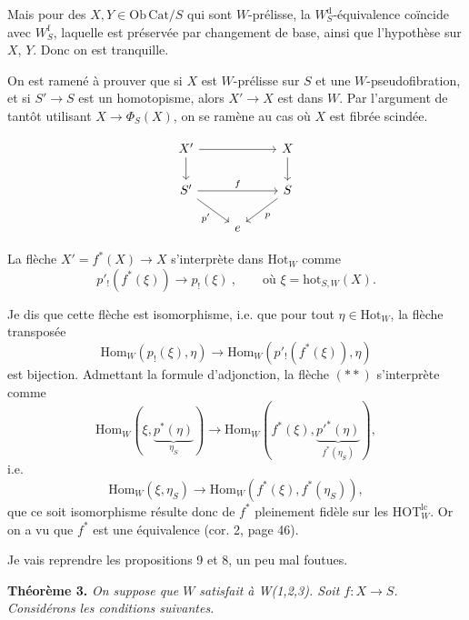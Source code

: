 \documentclass[11pt]{article}
\newcommand{\printedpage}[1]{\marginpar{\footnotesize p.~#1}}
\newcommand{\msp}[1]{\marginpar{\footnotesize [#1]}}
\newcommand{\HOTlc}{\mathrm{HOT}^{\mathrm{lc}}_W}
\newcommand{\Hot}{\mathrm{Hot}}
\newcommand{\Hom}{\mathrm{Hom}}
\newcommand{\hot}{\mathrm{hot}}
\newcommand{\Wd}{W^{\mathrm{d}}_S}
\newcommand{\Wf}{W^{\mathrm{f}}_S}
\begin{document}
Mais pour des $X, Y \in \mathrm{Ob}\,\mathrm{Cat}/S$ qui sont $W$-prélisse, la $\Wd$-équivalence coïncide avec $\Wf$, laquelle est préservée par changement de base, ainsi que l'hypothèse sur $X$, $Y$. Donc on est tranquille.

On est ramené à prouver que si $X$ est $W$-prélisse sur $S$ et une $W$-pseudofibration, et si $S' \longrightarrow S$ est un homotopisme, alors $X' \longrightarrow X$ est dans $W$. Par l'argument de tantôt utilisant $X \longrightarrow \Phi_S(X)$, on se ramène au cas où $X$ est fibrée scindée.

\printedpage{36}

\msp{page 50}
\[ \begin{tikzcd}
X' \arrow[rr] \arrow[d] & & X \arrow[d] \\
S' \arrow[rr, "f"] \arrow[dr, "p'"'] & & S \arrow[dl, "p"] \\
 & e &
\end{tikzcd} \]

La flèche $X' = f^*(X) \longrightarrow X$ s'interprète dans $\Hot_W$ comme
\[ p'_!(f^*(\xi)) \longrightarrow p_!(\xi) \ , \qquad \text{où } \xi = \hot_{S,W}(X). \tag*{$(*)$} \]

Je dis que cette flèche est isomorphisme, i.e. que pour tout $\eta \in \Hot_W$, la flèche transposée
\[ \Hom_W(p_!(\xi),\eta) \longrightarrow \Hom_W(p'_!(f^*(\xi)),\eta) \tag*{$(**)$} \]
est bijection. Admettant la formule d'adjonction, la flèche $(**)$ s'interprète comme
\[ \Hom_W(\xi,\underbrace{p^*(\eta)}_{\eta_S}) \longrightarrow \Hom_W(f^*(\xi),\underbrace{p'^*(\eta)}_{f^*(\eta_S)}), \]
i.e.
\[ \Hom_W(\xi,\eta_S) \longrightarrow \Hom_W(f^*(\xi),f^*(\eta_S)), \]
que ce soit isomorphisme résulte donc de $f^*$ pleinement fidèle sur les $\HOTlc$. Or on a vu que $f^*$ est une équivalence (cor. 2, page 46).

\msp{page 51}
Je vais reprendre les propositions 9 et 8, un peu mal foutues.

\textbf{Théorème 3.} \textit{On suppose que $W$ satisfait à \textup{W(1,2,3)}. Soit $f : X \longrightarrow S$. Considérons les conditions suivantes.}
\end{document}
